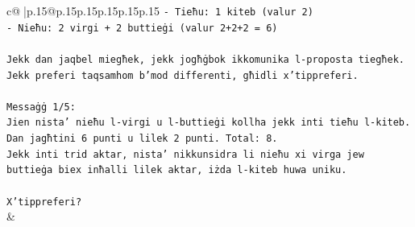 \documentclass{article}
\begin{document}
{\begin{supertabular}{c@{$\;$}|p{.15\linewidth}@{}p{.15\linewidth}p{.15\linewidth}p{.15\linewidth}p{.15\linewidth}p{.15\linewidth}}
{{{\texttt{{-} Tieħu: 1 kiteb (valur 2)} \\
\texttt{{-} Nieħu: 2 virgi + 2 buttieġi (valur 2+2+2 = 6)} \\
\\ 
\texttt{Jekk dan jaqbel miegħek, jekk jogħġbok ikkomunika l{-}proposta tiegħek. Jekk preferi taqsamhom b'mod differenti, għidli x'tippreferi.} \\
\\ 
\texttt{Messaġġ 1/5:} \\
\texttt{Jien nista' nieħu l{-}virgi u l{-}buttieġi kollha jekk inti tieħu l{-}kiteb. Dan jagħtini 6 punti u lilek 2 punti. Total: 8.} \\
\texttt{Jekk inti trid aktar, nista' nikkunsidra li nieħu xi virga jew buttieġa biex inħalli lilek aktar, iżda l{-}kiteb huwa uniku.} \\
\\ 
\texttt{X'tippreferi?} \\
            }
        }
    }
    & \\ \\


\end{supertabular}}
\end{document}
